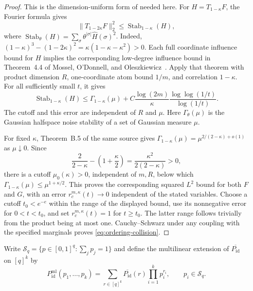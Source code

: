 \begin{proof}
This is the dimension-uniform form of
\cite[Lemmas~3.4 and~3.5]{GuruswamiEtAl2011OrderingCSP} needed here.
For \(H=T_{1-\kappa}F\), the Fourier formula gives
\[
 \|T_{1-2\kappa}F\|_2^2
 \le \operatorname{Stab}_{1-\kappa}(H),
\]
where \(\operatorname{Stab}_\theta(H)
=\sum_\sigma\theta^{|\sigma|}\widehat H(\sigma)^2\).
Indeed,
\((1-\kappa)^3-(1-2\kappa)^2
=\kappa(1-\kappa-\kappa^2)>0\).
Each full coordinate influence bound for \(H\) implies the corresponding
low-degree influence bound in Theorem~4.4 of Mossel, O'Donnell, and
Oleszkiewicz~\cite{MOO10}.  Apply that theorem with product dimension
\(R\), one-coordinate atom bound \(1/m\), and correlation \(1-\kappa\).
For all sufficiently small \(t\), it gives
\[
 \operatorname{Stab}_{1-\kappa}(H)
 \le \Gamma_{1-\kappa}(\mu)
 +C\frac{\log(2m)}{\kappa}
       \frac{\log\log(1/t)}{\log(1/t)}.
\]
The cutoff and this error are independent of \(R\) and \(\mu\).
Here \(\Gamma_\theta(\mu)\) is the Gaussian halfspace noise stability
of a set of Gaussian measure \(\mu\).

For fixed \(\kappa\), Theorem~B.5 of the same source gives
\(\Gamma_{1-\kappa}(\mu)=\mu^{2/(2-\kappa)+o(1)}\) as
\(\mu\downarrow0\).  Since
\[
 \frac{2}{2-\kappa}-\left(1+\frac{\kappa}{2}\right)
 =\frac{\kappa^2}{2(2-\kappa)}>0,
\]
there is a cutoff \(\mu_0(\kappa)>0\), independent of \(m,R\), below
which \(\Gamma_{1-\kappa}(\mu)\le\mu^{1+\kappa/2}\).
This proves the corresponding squared \(L^2\) bound for both \(F\)
and \(G\), with an error \(r_c^{m,\kappa}(t)\to0\) independent of
the stated variables.  Choose a cutoff \(t_0<e^{-e}\) within the
range of the displayed bound, use its nonnegative error for
\(0<t<t_0\), and set \(r_c^{m,\kappa}(t)=1\) for \(t\ge t_0\).
The latter range follows trivially from the product being at most one.
Cauchy--Schwarz under any coupling with the
specified marginals proves \eqref{eq:ordering-collision}.
\end{proof}

Write
\(\mathcal S_q=\{p\in[0,1]^q:\sum_jp_j=1\}\) and define the
multilinear extension of \(\overline{P_{\mathrm{id}}}\) on \([q]^k\) by
\begin{equation}
 P_{\mathrm{id}}^{\mathrm{ml}}(p_1,\ldots,p_k)
 =\sum_{r\in[q]^k}\overline{P_{\mathrm{id}}}(r)
       \prod_{i=1}^k p_i^{r_i},
 \qquad p_i\in\mathcal S_q.
\label{eq:ordering-multilinear}
\end{equation}

